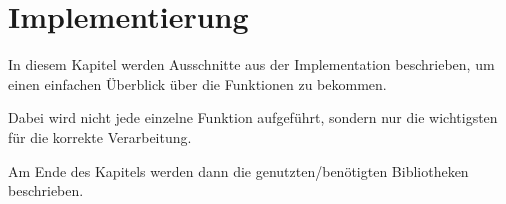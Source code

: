 \chapter{Implementierung}
\writtenby{\dcauthornameriren}%
In diesem Kapitel werden Ausschnitte aus der Implementation beschrieben, um einen einfachen Überblick über die Funktionen zu bekommen.

Dabei wird nicht jede einzelne Funktion aufgeführt, sondern nur die wichtigsten für die korrekte Verarbeitung.

Am Ende des Kapitels werden dann die genutzten/benötigten Bibliotheken beschrieben.



